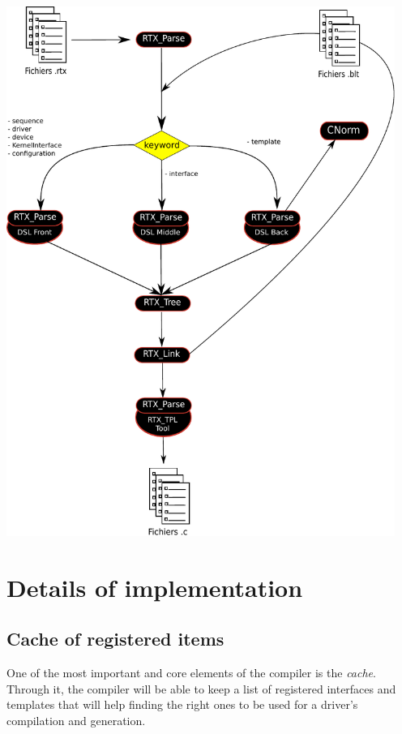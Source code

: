 \documentclass[american]{rtxreport}
\begin{document}
\includegraphics[width=0.95\textwidth]{logigramme.pdf}



\chapter{Details of implementation}


\section{Cache of registered items}

One of the most important and core elements of the compiler is the
\emph{cache}.  Through it, the compiler will be able to keep a list of
registered interfaces and templates that will help finding the right ones to be
used for a driver's compilation and generation.
\end{document}
